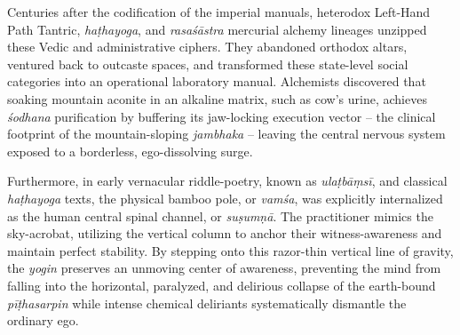 \documentclass[11pt,twoside,letterpaper]{article}
\begin{document}
Centuries after the codification of the imperial manuals, heterodox Left-Hand Path Tantric, \textit{haṭhayoga}, and \textit{rasaśāstra} mercurial alchemy lineages unzipped these Vedic and administrative ciphers. They abandoned orthodox altars, ventured back to outcaste spaces, and transformed these state-level social categories into an operational laboratory manual. Alchemists discovered that soaking mountain aconite in an alkaline matrix, such as cow's urine, achieves \textit{śodhana} purification by buffering its jaw-locking execution vector -- the clinical footprint of the mountain-sloping \textit{jambhaka} -- leaving the central nervous system exposed to a borderless, ego-dissolving surge. 

Furthermore, in early vernacular riddle-poetry, known as \textit{ulaṭbāṃsī}, and classical \textit{haṭhayoga} texts, the physical bamboo pole, or \textit{vamśa}, was explicitly internalized as the human central spinal channel, or \textit{suṣumṇā}. The practitioner mimics the sky-acrobat, utilizing the vertical column to anchor their witness-awareness and maintain perfect stability. By stepping onto this razor-thin vertical line of gravity, the \textit{yogin} preserves an unmoving center of awareness, preventing the mind from falling into the horizontal, paralyzed, and delirious collapse of the earth-bound \textit{pīṭhasarpin} while intense chemical deliriants systematically dismantle the ordinary ego.
\end{document}
